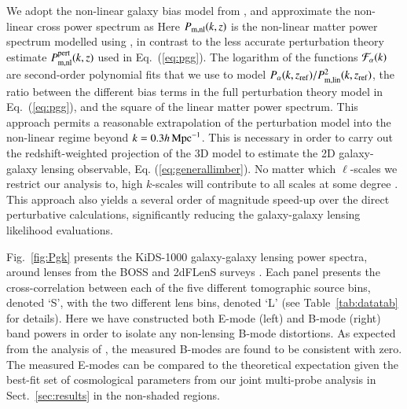 We adopt the non-linear galaxy bias model from \citet{sanchez/etal:2017}, and approximate the non-linear cross power spectrum as
Here $P_{\rm m, nl}(k,z)$ is the non-linear matter power spectrum modelled using \citet{mead/etal:2015}, in contrast to the less accurate perturbation theory estimate $P_{\rm m, nl}^{\rm pert}(k,z)$ used in Eq.~(\ref{eq:pgg}). 
The logarithm of the functions ${\cal F}_\alpha(k)$ are second-order polynomial fits that we use to model $P_\alpha(k,z_{\rm ref})/P^2_{\rm m, lin}(k,z_{\rm ref})$, the ratio between the different bias terms in the full perturbation theory model in Eq.~(\ref{eq:pgg}), and the square of the linear matter power spectrum.  This approach permits a reasonable extrapolation of the \citet{sanchez/etal:2017} perturbation model into the non-linear regime beyond $k = 0.3 h \,{\rm Mpc}^{-1}$.   This is necessary in order to carry out the redshift-weighted projection of the 3D model to estimate the 2D galaxy-galaxy lensing observable, Eq. (\ref{eq:generallimber}).  No matter which $\ell$-scales we restrict our analysis to, high $k$-scales will contribute to all scales at some degree \citep{joachimi/etal:inprep, asgari/etal:2020}.   This approach also yields a several order of magnitude speed-up over the direct perturbative calculations, significantly reducing the galaxy-galaxy lensing likelihood evaluations.  

Fig.~\ref{fig:Pgk} presents the KiDS-1000 galaxy-galaxy lensing power spectra, around lenses from the BOSS and 2dFLenS surveys \citep[see][for the real-space KiDS-1000 galaxy-galaxy lensing measurements for BOSS and 2dFLenS separately]{blake/etal:2020}.   Each panel presents the cross-correlation between each of the five different tomographic source bins, denoted `S', with the two different lens bins, denoted `L' (see Table~\ref{tab:datatab} for details).  Here we have constructed both E-mode (left) and B-mode (right) band powers in order to isolate any non-lensing B-mode distortions.     As expected from the analysis of \citet{giblin/etal:inprep}, the measured B-modes are found to be consistent with zero.   The measured E-modes can be compared to the theoretical expectation given the best-fit set of cosmological parameters from our joint multi-probe analysis in Sect.~\ref{sec:results} in the non-shaded regions.    

